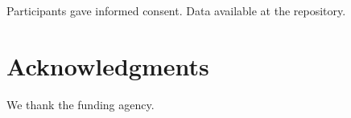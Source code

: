 \documentclass{article}
\author{Anonymous Authors}
\begin{document}
Participants gave informed consent. Data available at the repository.
\section{Acknowledgments}
We thank the funding agency.
\end{document}
